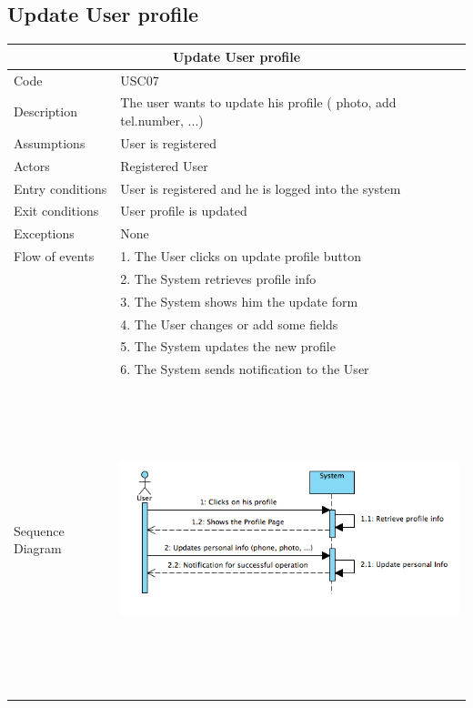 \documentclass[12pt]{book}
\begin{document}
\subsection{Update User profile}
\vspace*{\fill}
\begin{center}
\begin{tabular}{ |l|l| }
  		\hline
  		\hline
  		\multicolumn{2}{|c|}{\large{\textbf{Update User profile}}} \\
  		\hline
  		\hline
  		Code  & USC07\\ 
		\hline
		Description &  The user wants to update his profile ( photo, add tel.number, ...)\\
		\hline
		Assumptions & User is registered\\
		\hline
		Actors & Registered User\\
		\hline
		Entry conditions & User is registered and he is logged into the system\\
		\hline
		Exit conditions & User profile is updated \\
		\hline
		Exceptions & None  \\
		\hline
		Flow of events &  
			1. The User clicks on update profile button\\&	
			2. The System retrieves profile info\\&
			3. The System shows him the update form\\&
			4. The User changes or add some fields \\&
			5. The System updates the new profile \\ &
			6. The System sends notification to the User\\
  		\hline 
		Sequence Diagram & \includegraphics[width=13cm,height=9cm]{UpdateProfileSD}  \\
		\hline
  		\hline
\end{tabular} \\
\vspace*{\fill}
\end{center}
\end{document}
